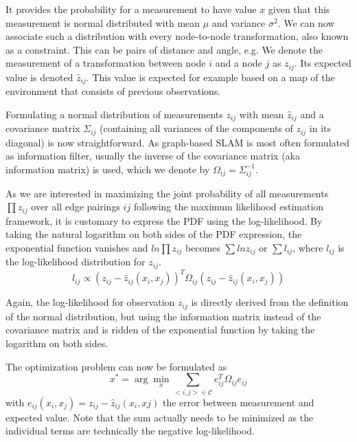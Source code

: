 It provides the probability for a measurement to have value $ x$ given that this measurement is normal distributed with mean $ \mu$ and variance $ \sigma^2$.  We can now associate such a distribution with every node-to-node transformation, also known as a constraint. This can be pairs of distance and angle, e.g. We denote the measurement of a transformation between node $i$ and a node $j$ as $ z_{ij}$. Its expected value is denoted $ \hat{z}_{ij}$. This value is expected for example based on a map of the environment that consists of previous observations.

Formulating a normal distribution of measurements $ z_{ij}$ with mean $ \hat{z}_{ij}$ and a covariance matrix $ \Sigma_{ij}$ (containing all variances of the components of $ z_{ij}$ in its diagonal) is now straightforward. As graph-based SLAM is most often formulated as  information filter, usually the inverse of the covariance matrix (aka information matrix) is used, which we denote by $ \Omega_{ij}=\Sigma_{ij}^{-1}$.

As we are interested in maximizing the joint probability of all measurements $ \prod{z_{ij}}$ over all edge pairings $ ij$ following the maximum likelihood estimation framework, it is customary to express the PDF using the log-likelihood. By taking the natural logarithm on both sides of the PDF expression, the exponential function vanishes and $ ln \prod{z_{ij}}$ becomes $ \sum{ ln z_{ij}}$ or $ \sum{l_{ij}}$, where $ l_{ij}$ is the log-likelihood distribution for $ z_{ij}$.
\begin{equation}
l_{ij} \propto (z_{ij}-\hat{z}_{ij}(x_i,x_j))^T\Omega_{ij}(z_{ij}-\hat{z}_{ij}(x_i,x_j))
\end{equation}

Again, the log-likelihood for observation $ z_{ij}$ is directly derived from the definition of the normal distribution, but using the information matrix instead of the covariance matrix and is ridden of the exponential function by taking the logarithm on both sides.

The optimization problem can now be formulated as
\begin{equation}\label{eq:slamEM}
x^* = \arg \min_{x}\sum_{<i,j>\in \mathcal{C}}e_{ij}^T\Omega_{ij}e_{ij}
\end{equation}
with $ e_{ij}(x_i,x_j)=z_{ij}-\hat{z}_{ij}(x_i,xj)$ the error between measurement and expected value. Note that the sum actually needs to be minimized as the individual terms are technically the negative log-likelihood.

